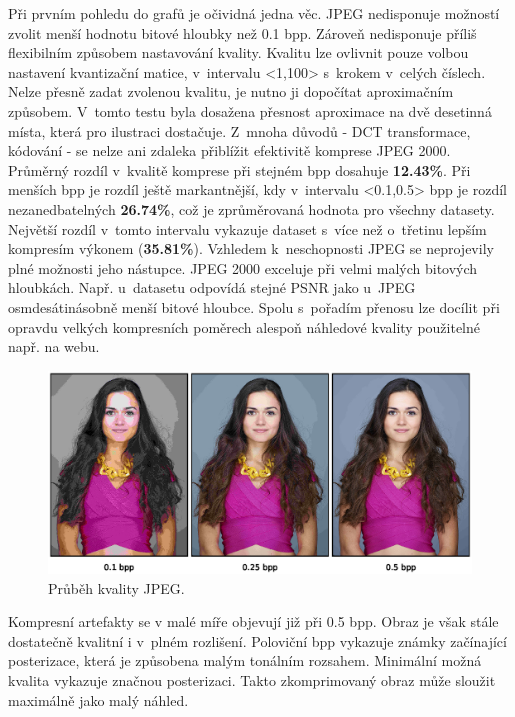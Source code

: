 \noindent Při prvním pohledu do grafů je očividná jedna věc. JPEG nedisponuje možností zvolit menší hodnotu bitové hloubky než 0.1 bpp. Zároveň nedisponuje příliš flexibilním způsobem nastavování kvality. Kvalitu lze ovlivnit pouze volbou nastavení kvantizační matice, v~intervalu <1,100> s~krokem v~celých číslech. Nelze přesně zadat zvolenou kvalitu, je nutno ji dopočítat aproximačním způsobem. V~tomto testu byla dosažena přesnost aproximace na dvě desetinná místa, která pro ilustraci dostačuje.
Z~mnoha důvodů - DCT transformace, kódování - se nelze ani zdaleka přiblížit efektivitě komprese JPEG 2000. Průměrný rozdíl v~kvalitě komprese při stejném bpp dosahuje \textbf{12.43\%}. Při menších bpp je rozdíl ještě markantnější, kdy v~intervalu <0.1,0.5> bpp je rozdíl nezanedbatelných \textbf{26.74\%}, což je zprůměrovaná hodnota pro všechny datasety. Největší rozdíl v~tomto intervalu vykazuje dataset  s~více než o~třetinu lepším kompresím výkonem (\textbf{35.81\%}). Vzhledem k~neschopnosti JPEG se neprojevily plné možnosti jeho nástupce. JPEG 2000 exceluje při velmi malých bitových hloubkách. Např. u~datasetu  odpovídá stejné PSNR jako u~JPEG osmdesátinásobně menší bitové hloubce. Spolu s~pořadím přenosu lze docílit při opravdu velkých kompresních poměrech alespoň náhledové kvality použitelné např. na webu.

\begin{figure}[hbt!]
  \centering
  \hspace*{-0.75cm}
  \includegraphics[width=16cm]{obrazky-figures/odhad/fotky_kvalita_jpeg_odhad.eps}
  \caption{Průběh kvality JPEG.}
\end{figure}

\noindent Kompresní artefakty se v malé míře objevují již při 0.5 bpp. Obraz je však stále dostatečně kvalitní i v~plném rozlišení. Poloviční bpp vykazuje známky začínající posterizace, která je způsobena malým tonálním rozsahem. Minimální možná kvalita vykazuje značnou posterizaci. Takto zkomprimovaný obraz může sloužit maximálně jako malý náhled.

